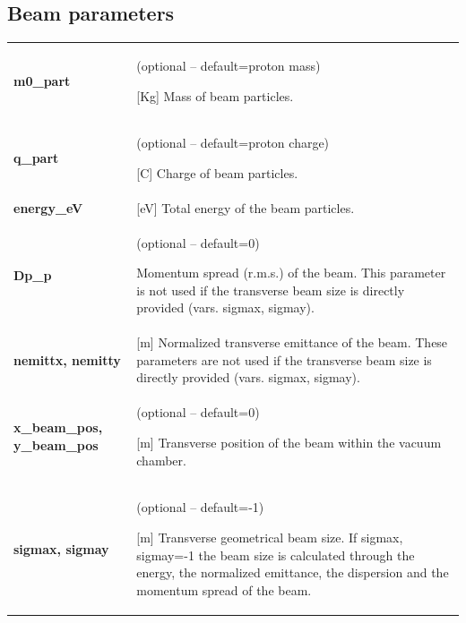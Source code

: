 \documentclass[a4paper,12pt]{article}
\begin{document}
\newpage

\subsection{Beam parameters}

\begin{longtable}{p{}p{}}
\hline\endfirsthead\hline\endhead\rowcolor{Gray}
\multicolumn{2}{p{.97\textwidth}}{
\textbf{Basic definitions}
}\\ \hline
\textbf{m0\_part}& 	(optional -- default=proton mass)

[Kg] Mass of beam particles. \\ \hline
\textbf{q\_part}& 	(optional -- default=proton charge)

[C] Charge of beam particles. \\ \hline
\textbf{energy\_eV}& 	[eV] Total energy of the beam particles.\\ \hline
\textbf{Dp\_p}& 	(optional -- default=0)

Momentum spread (r.m.s.) of the beam. This parameter is not used if the transverse beam size is directly provided (vars. sigmax, sigmay).\\ \hline
\textbf{nemittx, nemitty}& 	[m] Normalized transverse emittance of the beam. These parameters are not used if the transverse beam size is directly provided (vars. sigmax, sigmay).\\ \hline
\textbf{x\_beam\_pos, y\_beam\_pos}& 	(optional -- default=0)

[m] Transverse position of the beam within the vacuum chamber.\\ \hline
\textbf{sigmax, sigmay}&	(optional -- default=-1)

[m] Transverse geometrical beam size. If sigmax, sigmay=-1 the beam size is calculated through the energy, the normalized emittance, the dispersion and the momentum spread of the beam.\\
\hline
\end{longtable}
\end{document}
